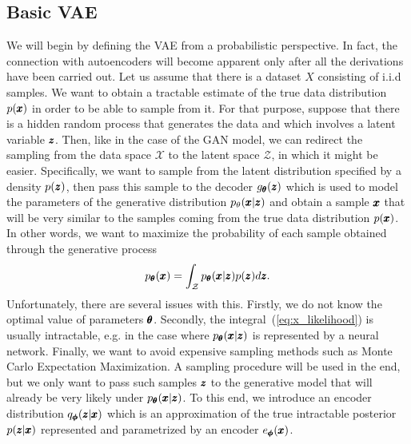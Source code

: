 \subsection{Basic VAE} \label{sec:vanilla_vae}
We will begin by defining the VAE from a probabilistic perspective. In fact, the connection with autoencoders will become apparent only after all the derivations have been carried out. Let us assume that there is a dataset $X$ consisting of i.i.d samples. We want to obtain a tractable estimate of the true data distribution $p(\pmb{{x}})$ in order to be able to sample from it. For that purpose, suppose that there is a hidden random process that generates the data and which involves a latent variable $\pmb{{z}}$. Then, like in the case of the GAN model, we can redirect the sampling from the data space $\mathcal{X}$ to the latent space
$\mathcal{Z}$, in which it might be easier. Specifically, we want to sample from the latent distribution specified by a density $p(\pmb{{z}})$, then pass this sample to the decoder $g_{\pmb{{\theta}}}(\pmb{{z}})$ which is used to model the parameters of the generative distribution $p_{\theta}(\pmb{{x}}|\pmb{{z}})$ and obtain a sample $\pmb{{x}}$ that will be very similar to the samples coming from the true data distribution $p(\pmb{{x}})$. In other words, we want to maximize the probability of each sample obtained through the generative process
\begin{equation}
p_{\pmb{{\theta}}}(\pmb{{x}})=\int_{\mathcal{Z}}p_{\pmb{{\theta}}}(\pmb{{x}}|\pmb{{z}})p(\pmb{{z}})d\pmb{{z}}.\label{eq:x_likelihood}
\end{equation}
Unfortunately, there are several issues with this. Firstly, we do not know the optimal value of parameters $\pmb{{\theta}}$. Secondly, the integral~(\ref{eq:x_likelihood}) is usually intractable, e.g. in the case where $p_{\pmb{{\theta}}}(\pmb{{x}}|\pmb{{z}})$ is represented by a neural network. Finally, we want to avoid expensive sampling methods such as Monte Carlo Expectation Maximization. A sampling procedure will be used in the end, but we only want to pass such samples $\pmb{{z}}$ to the generative model that will already be very likely under $p_{\pmb{{\theta}}}(\pmb{{x}}|\pmb{{z}})$. To this end, we introduce an encoder distribution $q_{\pmb{{\phi}}}(\pmb{{z}}|\pmb{{x}})$ which is an approximation of the true intractable posterior $p(\pmb{{z}}|\pmb{{x}})$ represented and parametrized by an encoder $e_{\pmb{{\phi}}}(\pmb{{x}})$.

